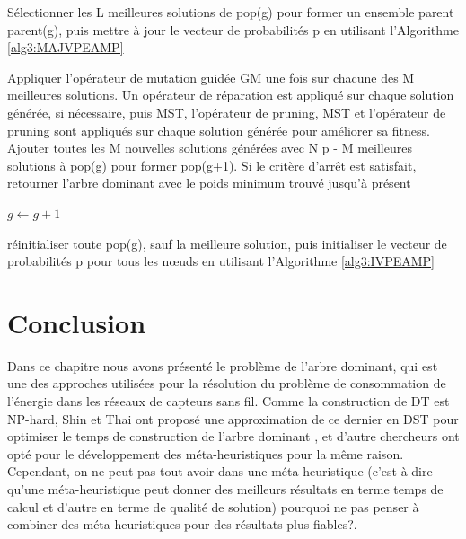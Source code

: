 \begin{enumerate}[label=\alph*)]
\begin{algorithm}[H]
{	Sélectionner les L meilleures solutions de pop(g) pour former un ensemble parent
	parent(g), puis mettre à jour le vecteur de probabilités p en utilisant 				l’Algorithme \ref{alg3:MAJVPEAMP} \;\;

	Appliquer l’opérateur de mutation guidée GM une fois sur chacune des M meilleures
	solutions. Un opérateur de réparation est appliqué sur chaque solution générée, 		si nécessaire, puis MST, l’opérateur de pruning, MST et l’opérateur de pruning 			sont appliqués sur chaque solution générée pour améliorer sa fitness. Ajouter 			toutes les M nouvelles solutions générées avec N p - M meilleures solutions à 			pop(g) pour former pop(g+1). Si le critère d’arrêt est satisfait, retourner 			l’arbre dominant avec le poids minimum trouvé jusqu’à présent \;\;

	$ g \gets g + 1 $ \;

			{
		réinitialiser toute pop(g), sauf la meilleure solution, puis initialiser le 			vecteur de probabilités p pour tous les nœuds en utilisant l’Algorithme 				\ref{alg3:IVPEAMP}	
	}
	
}

\end{algorithm}


\end{enumerate}


\section{Conclusion}
Dans ce chapitre nous avons présenté le problème de l’arbre dominant, qui est une des approches utilisées pour la résolution du problème de consommation de l’énergie dans les réseaux de capteurs sans fil. Comme la construction de DT est NP-hard, Shin et Thai ont proposé une approximation de ce dernier en DST pour optimiser le temps de construction de l’arbre dominant \cite{shin2010approximation}, et d’autre chercheurs ont opté pour le développement des méta-heuristiques pour la même raison. Cependant, on ne peut pas tout avoir dans une méta-heuristique (c’est à dire qu’une méta-heuristique peut donner des meilleurs résultats en terme temps de calcul et d’autre en terme de qualité de solution) pourquoi ne pas penser à combiner des méta-heuristiques pour des résultats plus fiables?.

 